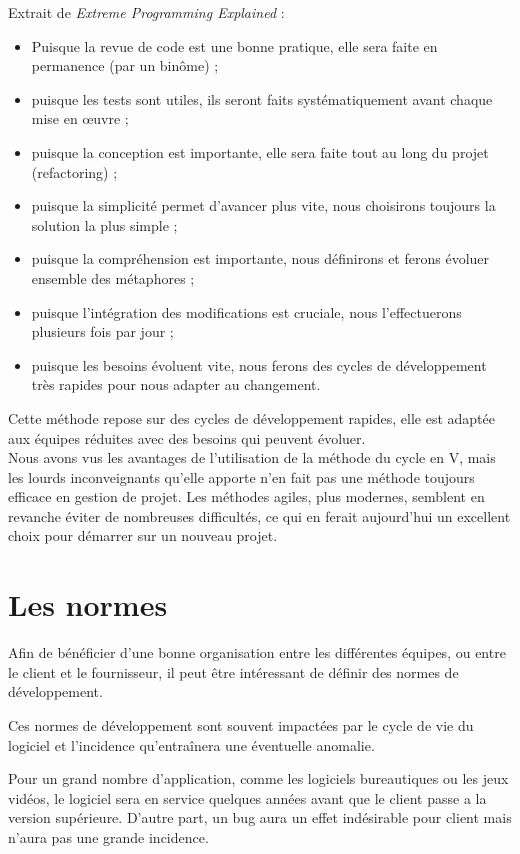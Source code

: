 Extrait de \textit{Extreme Programming Explained} :
\begin{Quote}
\begin{itemize}
\item Puisque la revue de code est une bonne pratique, elle sera faite en permanence (par un binôme) ;
\item puisque les tests sont utiles, ils seront faits systématiquement avant chaque mise en œuvre ;
\item puisque la conception est importante, elle sera faite tout au long du projet (refactoring) ;
\item puisque la simplicité permet d'avancer plus vite, nous choisirons toujours la solution la plus simple ;
\item puisque la compréhension est importante, nous définirons et ferons évoluer ensemble des métaphores ;
\item puisque l'intégration des modifications est cruciale, nous l'effectuerons plusieurs fois par jour ;
\item puisque les besoins évoluent vite, nous ferons des cycles de développement très rapides pour nous adapter au changement.
\end{itemize}
\end{Quote}

Cette méthode repose sur des cycles de développement rapides, elle est adaptée aux équipes réduites avec des besoins qui peuvent évoluer.\\

Nous avons vus les avantages de l'utilisation de la méthode du cycle en V, mais les lourds inconveignants qu'elle apporte n'en fait pas une méthode toujours efficace en gestion de projet. Les méthodes agiles, plus modernes, semblent en revanche éviter de nombreuses difficultés, ce qui en ferait aujourd'hui un excellent choix pour démarrer sur un nouveau projet.

\section{Les normes}

Afin de bénéficier d'une bonne organisation entre les différentes équipes, ou entre le client et le fournisseur, il peut être intéressant de définir des normes de développement.

Ces normes de développement sont souvent impactées par le cycle de vie du logiciel et l'incidence qu'entraînera une éventuelle anomalie.

Pour un grand nombre d'application, comme les logiciels bureautiques ou les jeux vidéos, le logiciel sera en service quelques années avant que le client passe a la version supérieure. D'autre part, un bug aura un effet indésirable pour client mais n'aura pas une grande incidence.

